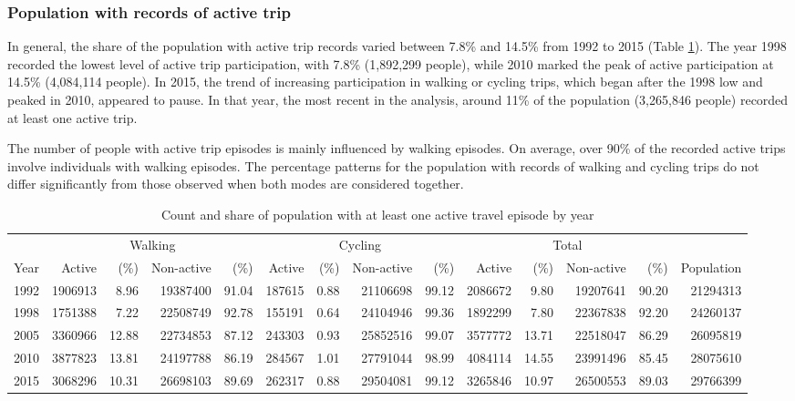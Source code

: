 \documentclass[preprint, 3p,
authoryear]{elsarticle} %
\begin{document}
\hypertarget{population-with-records-of-active-trip}{%
\subsubsection{Population with records of active
trip}\label{population-with-records-of-active-trip}}

In general, the share of the population with active trip records varied
between 7.8\% and 14.5\% from 1992 to 2015 (Table
\ref{tab:active-pop-proportion-table}). The year 1998 recorded the
lowest level of active trip participation, with 7.8\% (1,892,299
people), while 2010 marked the peak of active participation at 14.5\%
(4,084,114 people). In 2015, the trend of increasing participation in
walking or cycling trips, which began after the 1998 low and peaked in
2010, appeared to pause. In that year, the most recent in the analysis,
around 11\% of the population (3,265,846 people) recorded at least one
active trip.

The number of people with active trip episodes is mainly influenced by
walking episodes. On average, over 90\% of the recorded active trips
involve individuals with walking episodes. The percentage patterns for
the population with records of walking and cycling trips do not differ
significantly from those observed when both modes are considered
together.

\begingroup\fontsize{6}{8}\selectfont

\begin{longtable}[t]{rrrrrrrrrrrrrr}
\caption{\label{tab:active_pop_proportion_table}\label{tab:active-pop-proportion-table}Count and share of population with at least one active travel episode by year}\\
\toprule
\multicolumn{1}{c}{ } & \multicolumn{4}{c}{Walking} & \multicolumn{4}{c}{Cycling} & \multicolumn{4}{c}{Total} \\
\cmidrule(l{3pt}r{3pt}){2-5} \cmidrule(l{3pt}r{3pt}){6-9} \cmidrule(l{3pt}r{3pt}){10-13}
Year & Active & (\%) & Non-active & (\%) & Active & (\%) & Non-active & (\%) & Active & (\%) & Non-active & (\%) & Population\\
\midrule
1992 & 1906913 & 8.96 & 19387400 & 91.04 & 187615 & 0.88 & 21106698 & 99.12 & 2086672 & 9.80 & 19207641 & 90.20 & 21294313\\
1998 & 1751388 & 7.22 & 22508749 & 92.78 & 155191 & 0.64 & 24104946 & 99.36 & 1892299 & 7.80 & 22367838 & 92.20 & 24260137\\
2005 & 3360966 & 12.88 & 22734853 & 87.12 & 243303 & 0.93 & 25852516 & 99.07 & 3577772 & 13.71 & 22518047 & 86.29 & 26095819\\
2010 & 3877823 & 13.81 & 24197788 & 86.19 & 284567 & 1.01 & 27791044 & 98.99 & 4084114 & 14.55 & 23991496 & 85.45 & 28075610\\
2015 & 3068296 & 10.31 & 26698103 & 89.69 & 262317 & 0.88 & 29504081 & 99.12 & 3265846 & 10.97 & 26500553 & 89.03 & 29766399\\
\bottomrule
\end{longtable}
\endgroup{}
\end{document}
